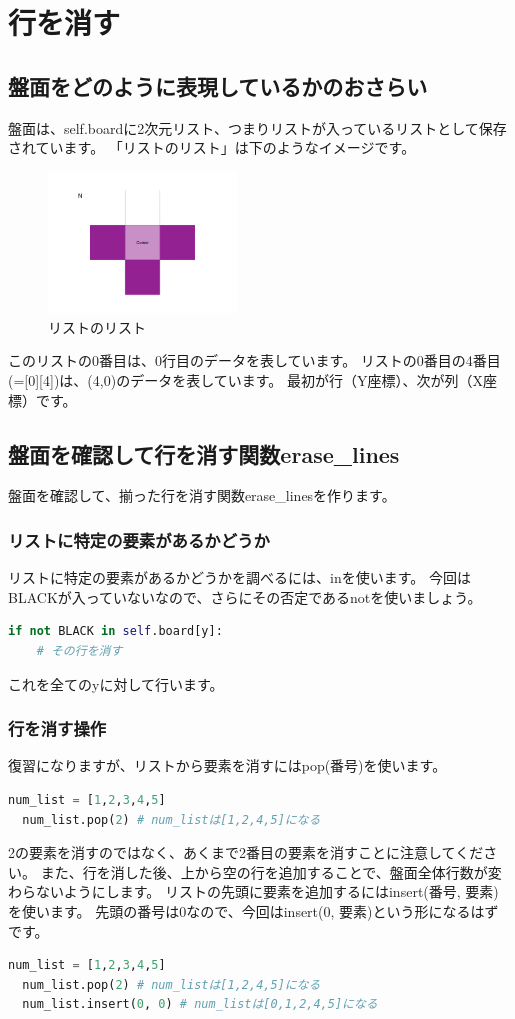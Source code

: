 \chapter{行を消す}
\section{盤面をどのように表現しているかのおさらい}
盤面は、self.boardに2次元リスト、つまりリストが入っているリストとして保存されています。
「リストのリスト」は下のようなイメージです。
\begin{figure}
  [h]
  \centering
  \includegraphics[width=50mm, page=25]{images/Elements.pdf}
  \caption{リストのリスト}
\end{figure}
このリストの0番目は、0行目のデータを表しています。
リストの0番目の4番目(=[0][4])は、(4,0)のデータを表しています。
最初が行（Y座標）、次が列（X座標）です。
\section{盤面を確認して行を消す関数erase\_lines}
盤面を確認して、揃った行を消す関数erase\_linesを作ります。
\subsection{リストに特定の要素があるかどうか}
リストに特定の要素があるかどうかを調べるには、inを使います。
今回はBLACKが入っていないなので、さらにその否定であるnotを使いましょう。
\begin{lstlisting}[caption=リストに特定の要素があるかどうか,label=sample, language=Python]
if not BLACK in self.board[y]:
    # その行を消す
\end{lstlisting}
これを全てのyに対して行います。
\subsection{行を消す操作}
復習になりますが、リストから要素を消すにはpop(番号)を使います。
\begin{lstlisting}[caption=リストから要素を消す,label=sample, language=Python]
  num_list = [1,2,3,4,5]
  num_list.pop(2) # num_listは[1,2,4,5]になる
\end{lstlisting}
2の要素を消すのではなく、あくまで2番目の要素を消すことに注意してください。
また、行を消した後、上から空の行を追加することで、盤面全体行数が変わらないようにします。
リストの先頭に要素を追加するにはinsert(番号, 要素)を使います。
先頭の番号は0なので、今回はinsert(0, 要素)という形になるはずです。
\begin{lstlisting}[caption=新たな行を追加,label=sample, language=Python]
  num_list = [1,2,3,4,5]
  num_list.pop(2) # num_listは[1,2,4,5]になる
  num_list.insert(0, 0) # num_listは[0,1,2,4,5]になる
\end{lstlisting}

